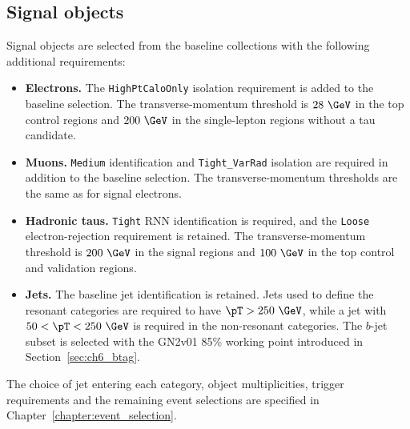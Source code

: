 \subsection{Signal objects}

Signal objects are selected from the baseline collections with the following additional requirements:
\begin{itemize}
    \item \textbf{Electrons.} The \texttt{HighPtCaloOnly} isolation requirement is added to the baseline selection. The transverse-momentum threshold is $28~\GeV$ in the top control regions and $200~\GeV$ in the single-lepton regions without a tau candidate.
    \item \textbf{Muons.} \texttt{Medium} identification and \texttt{Tight\_VarRad} isolation are required in addition to the baseline selection. The transverse-momentum thresholds are the same as for signal electrons.
    \item \textbf{Hadronic taus.} \texttt{Tight} RNN identification is required, and the \texttt{Loose} electron-rejection requirement is retained. The transverse-momentum threshold is $200~\GeV$ in the signal regions and $100~\GeV$ in the top control and validation regions.
    \item \textbf{Jets.} The baseline jet identification is retained. Jets used to define the resonant categories are required to have $\pT>250~\GeV$, while a jet with $50<\pT<250~\GeV$ is required in the non-resonant categories. The $b$-jet subset is selected with the GN2v01 85\% working point introduced in Section~\ref{sec:ch6_btag}.
\end{itemize}
The choice of jet entering each category, object multiplicities, trigger requirements and the remaining event selections are specified in Chapter~\ref{chapter:event_selection}.
